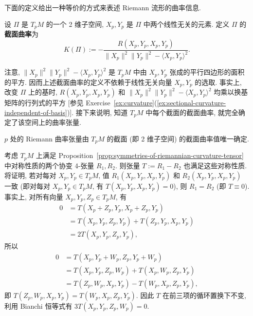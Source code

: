 下面的定义给出一种等价的方式来表述 Riemann 流形的曲率信息.

\begin{RiemannDefinition}\label{def:sectional-curvature}
设 $\Pi$ 是 $T_pM$ 的一个 2 维子空间, $X_p,Y_p$ 是 $\Pi$ 中两个线性无关的元素. 定义 $\Pi$ 的\textbf{截面曲率}为
\[
  K(\Pi):=-\frac{R(X_p,Y_p,X_p,Y_p)}
  {\lVert X_p\rVert^2\lVert Y_p\rVert^2-\langle X_p,Y_p\rangle^2}.
\]
\end{RiemannDefinition}

注意, $\lVert X_p\rVert^2\lVert Y_p\rVert^2-\langle X_p,Y_p\rangle^2$ 是 $T_pM$ 中由 $X_p,Y_p$ 张成的平行四边形的面积的平方. 因而上述截面曲率的定义不依赖于线性无关向量 $X_p,Y_p$ 的选取. 事实上, 改变 $\Pi$ 上的基时, $R(X_p,Y_p,X_p,Y_p)$ 和 $\lVert X_p\rVert^2\lVert Y_p\rVert^2-\langle X_p,Y_p\rangle^2$ 均乘以换基矩阵的行列式的平方 [参见 Exercise~\ref{ex:curvature}(\ref{ex:sectional-curvature-independent-of-basis})]. 接下来说明, 知道 $T_pM$ 中每个截面的截面曲率, 就完全确定了该空间上的曲率张量.

\begin{RiemannProposition}\label{prop:sectional-curvature-determines-curvature-tensor}
$p$ 处的 Riemann 曲率张量由 $T_pM$ 的截面 (即 2 维子空间) 的截面曲率值唯一确定.
\end{RiemannProposition}

\begin{RiemannProof}
考虑 $T_pM$ 上满足 Proposition~\ref{prop:symmetries-of-riemannian-curvature-tensor} 中对称性质的两个协变 4-张量 $R_1,R_2$. 则张量 $T:=R_1-R_2$ 也满足这些对称性质. 将证明, 若对每对 $X_p,Y_p\in T_pM$, 值 $R_1(X_p,Y_p,X_p,Y_p)$ 和 $R_2(X_p,Y_p,X_p,Y_p)$ 一致 (即对每对 $X_p,Y_p\in T_pM$, 有 $T(X_p,Y_p,X_p,Y_p)=0$), 则 $R_1=R_2$ (即 $T\equiv0$). 事实上, 对所有向量 $X_p,Y_p,Z_p\in T_pM$, 有
\begin{align*}
  0&=T(X_p+Z_p,Y_p,X_p+Z_p,Y_p)\\
   &=T(X_p,Y_p,Z_p,Y_p)+T(Z_p,Y_p,X_p,Y_p)\\
   &=2T(X_p,Y_p,Z_p,Y_p),
\end{align*}
所以
\begin{align*}
  0&=T(X_p,Y_p+W_p,Z_p,Y_p+W_p)\\
   &=T(X_p,Y_p,Z_p,W_p)+T(X_p,W_p,Z_p,Y_p)\\
   &=T(Z_p,W_p,X_p,Y_p)-T(W_p,X_p,Z_p,Y_p),
\end{align*}
即 $T(Z_p,W_p,X_p,Y_p)=T(W_p,X_p,Z_p,Y_p)$. 因此 $T$ 在前三项的循环置换下不变, 利用 Bianchi 恒等式有 $3T(X_p,Y_p,Z_p,W_p)=0$.
\end{RiemannProof}


